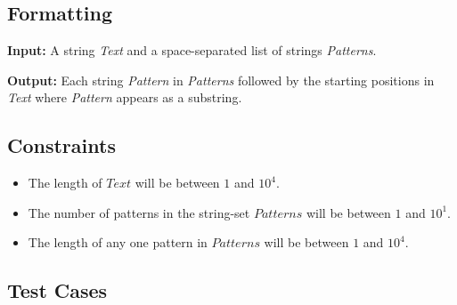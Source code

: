 \documentclass{article}
\begin{document}
\subsection*{Formatting}

\textbf{Input:} A string \emph{Text} and a space-separated list of strings \emph{Patterns}.

\noindent \textbf{Output:} Each string \emph{Pattern} in \emph{Patterns} followed by the starting positions in \emph{Text} where \emph{Pattern} appears as a substring.

\subsection*{Constraints}

\begin{itemize}
    \item The length of $Text$ will be between $1$ and $10^4$.
    \item The number of patterns in the string-set $Patterns$ will be between $1$ and $10^1$.
    \item The length of any one pattern in $Patterns$ will be between $1$ and $10^4$.
\end{itemize}
\pagebreak

\subsection*{Test Cases}
\end{document}
